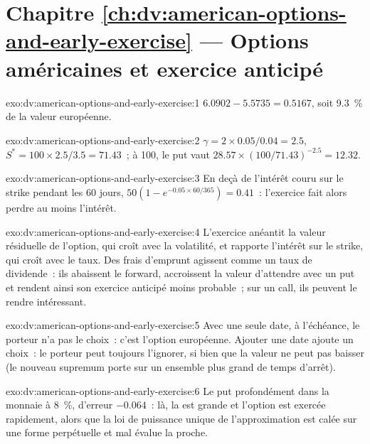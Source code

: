 \section*{Chapitre \ref{ch:dv:american-options-and-early-exercise} --- Options américaines et exercice anticipé}

\begin{solution}{exo:dv:american-options-and-early-exercise:1}
$6.0902-5.5735=0.5167$, soit 9.3~\% de la valeur européenne.
\end{solution}

\begin{solution}{exo:dv:american-options-and-early-exercise:2}
$\gamma=2\times0.05/0.04=2.5$, $S^*=100\times2.5/3.5=71.43$~; à 100, le put vaut
$28.57\times(100/71.43)^{-2.5}=12.32$.
\end{solution}

\begin{solution}{exo:dv:american-options-and-early-exercise:3}
En deçà de l'intérêt couru sur le strike pendant les 60 jours, $50(1-e^{-0.05\times60/365})=0.41$~:
l'exercice fait alors perdre au moins l'intérêt.
\end{solution}

\begin{solution}{exo:dv:american-options-and-early-exercise:4}
L'exercice anéantit la valeur résiduelle de l'option, qui croît avec la volatilité, et rapporte
l'intérêt sur le strike, qui croît avec le taux. Des frais d'emprunt agissent comme un
taux de dividende~: ils abaissent le forward, accroissent la valeur d'attendre avec un put et rendent ainsi
son exercice anticipé moins probable~; sur un call, ils peuvent le rendre intéressant.
\end{solution}

\begin{solution}{exo:dv:american-options-and-early-exercise:5}
Avec une seule date, à l'échéance, le porteur n'a pas le choix~: c'est l'option européenne. Ajouter
une date ajoute un choix~: le porteur peut toujours l'ignorer, si bien que la valeur ne peut pas baisser
(le nouveau supremum porte sur un ensemble plus grand de temps d'arrêt).
\end{solution}

\begin{solution}{exo:dv:american-options-and-early-exercise:6}
Le put profondément dans la monnaie à 8~\%, d'erreur $-0.064$~: là, la  est grande et
l'option est exercée rapidement, alors que la loi de puissance unique de l'approximation est calée sur une
forme perpétuelle et mal évalue la  proche.
\end{solution}

